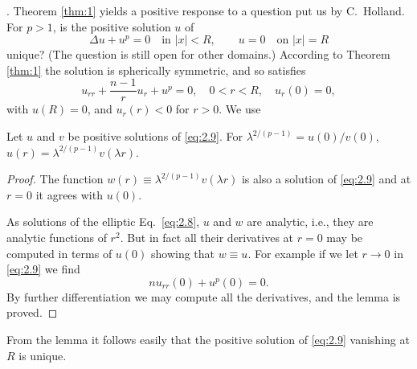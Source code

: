 . Theorem \ref{thm:1} yields a positive response to a question put us by C.~Holland.
For $p > 1$, is the positive solution $u$ of
\begin{equation}\label{eq:2.8}
  \Delta u + u^p = 0\quad \text{in } |x|<R,\qquad u = 0\quad \text{on } |x|=R
\end{equation}
unique? (The question is still open for other domains.)
According to Theorem \ref{thm:1} the solution is spherically symmetric, and so satisfies
\begin{equation}\label{eq:2.9}
  u_{rr} + \frac{n-1}{r} u_r + u^p = 0, \quad 0<r<R, \quad u_r(0) = 0,
\end{equation}
with $u(R) = 0$, and $u_r(r)<0$ for $r>0$. We use

\begin{lemma}\label{lemma:2.3}
  Let $u$ and $v$ be positive solutions of \eqref{eq:2.9}.
  For $\lambda^{2/(p-1)} = u(0)/v(0)$, $u(r) = \lambda^{2/(p-1)}v(\lambda r)$.
\end{lemma}

\begin{proof}
  The function $w(r)\equiv \lambda^{2/(p-1)}v(\lambda r)$
  is also a solution of \eqref{eq:2.9} and at $r=0$ it agrees with $u(0)$.

  As solutions of the elliptic Eq.~\eqref{eq:2.8}, $u$ and $w$ are analytic, i.e.,
  they are analytic functions of $r^2$. 
  But in fact all their derivatives at $r = 0$ may be computed in terms of $u(0)$
  showing that $w\equiv u$. For example if we let $r\to 0$ in \eqref{eq:2.9} we find
  \[nu_{rr}(0) + u^p(0) = 0.\]
  By further differentiation we may compute all the derivatives, and the lemma is proved.
\end{proof}

From the lemma it follows easily that the positive solution of \eqref{eq:2.9}
vanishing at $R$ is unique.
